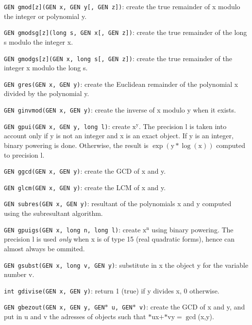 {\tt GEN gmod[z](GEN x, GEN y[, GEN z])}: create the true remainder of x 
modulo the integer or polynomial y.

{\tt GEN gmodsg[z](long s, GEN x[, GEN z])}: create the true remainder of the
long s modulo the integer x.

{\tt GEN gmodgs[z](GEN x, long s[, GEN z])}: create the true remainder of the 
integer x modulo the long s.

{\tt GEN gres(GEN x, GEN y)}: create the Euclidean remainder of the polynomial
x divided by the polynomial y.

{\tt GEN ginvmod(GEN x, GEN y)}: create the inverse of x modulo y when it
exists.

{\tt GEN gpui(GEN x, GEN y, long l)}: create $\text{x}^{\text{y}}$. The
precision l is taken into account only if y is not an integer and x is an
exact object. If y is an integer, binary powering is done. Otherwise, the
result is $\exp(\text{y}*\log(\text{x}))$ computed to precision l.

{\tt GEN ggcd(GEN x, GEN y)}: create the GCD of x and y.

{\tt GEN glcm(GEN x, GEN y)}: create the LCM of x and y.

{\tt GEN subres(GEN x, GEN y)}: resultant of the polynomials x and y computed
using the subresultant algorithm.

{\tt GEN gpuigs(GEN x, long n, long l)}: create $\text{x}^{\text{n}}$ using
binary powering. The precision l is used {\sl only\/} when x is of type 15
(real quadratic forms), hence can almost always be ommited.

{\tt GEN gsubst(GEN x, long v, GEN y)}: substitute in x the object y for the 
variable number v.

{\tt int gdivise(GEN x, GEN y)}:  return 1 (true) if y divides x, 0 otherwise.

{\tt GEN gbezout(GEN x, GEN y, GEN$*$ u, GEN$*$ v)}: create the GCD of x and y,
and put in u and v the adresses of objects such that $*$ux$+$$*$vy$=\gcd$(x,y).


\vfill\eject
